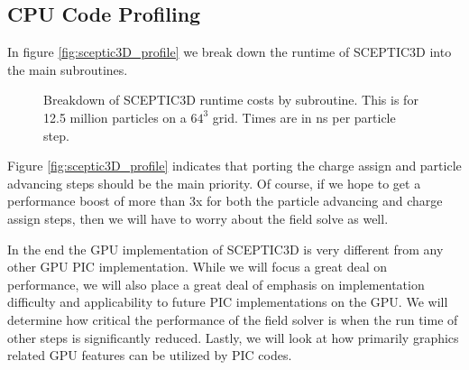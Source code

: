 	\subsection{CPU Code Profiling}
In figure \ref{fig:sceptic3D_profile} we break down the runtime of SCEPTIC3D into the main subroutines. 


\begin{figure}
\begin{center}

\end{center}
\caption{Breakdown of SCEPTIC3D runtime costs by subroutine. This is for 12.5 million particles on a $64^3$ grid. Times are in ns per particle step.}
\label{fig:pic_flowchart_parallel}
\end{figure}

Figure \ref{fig:sceptic3D_profile} indicates that porting the charge assign and particle advancing steps should be the main priority. Of course, if we hope to get a performance boost of more than 3x for both the particle advancing and charge assign steps, then we will have to worry about the field solve as well. 



In the end the GPU implementation of SCEPTIC3D is very different from any other GPU PIC implementation. While we will focus a great deal on performance, we will also place a great deal of emphasis on implementation difficulty and applicability to future PIC implementations on the GPU. We will determine how critical the performance of the field solver is when the run time of other steps is significantly reduced. Lastly, we will look at how primarily graphics related GPU features can be utilized by PIC codes. 













